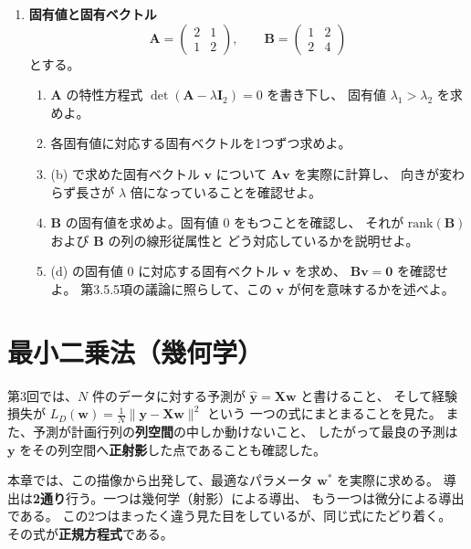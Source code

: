 \begin{enumerate}
  \item \textbf{固有値と固有ベクトル}\quad
    \begin{equation*}
      \bm{A} = \begin{pmatrix} 2 & 1 \\ 1 & 2 \end{pmatrix},
      \qquad
      \bm{B} = \begin{pmatrix} 1 & 2 \\ 2 & 4 \end{pmatrix}
    \end{equation*}
    とする。
    \begin{enumerate}
      \item $\bm{A}$ の特性方程式 $\det(\bm{A} - \lambda\bm{I}_2) = 0$ を書き下し、
        固有値 $\lambda_1 > \lambda_2$ を求めよ。
      \item 各固有値に対応する固有ベクトルを1つずつ求めよ。
      \item (b) で求めた固有ベクトル $\bm{v}$ について $\bm{A}\bm{v}$ を実際に計算し、
        向きが変わらず長さが $\lambda$ 倍になっていることを確認せよ。
      \item $\bm{B}$ の固有値を求めよ。固有値 $0$ をもつことを確認し、
        それが $\mathrm{rank}(\bm{B})$ および $\bm{B}$ の列の線形従属性と
        どう対応しているかを説明せよ。
      \item (d) の固有値 $0$ に対応する固有ベクトル $\bm{v}$ を求め、
        $\bm{B}\bm{v} = \bm{0}$ を確認せよ。
        第3.5.5項の議論に照らして、この $\bm{v}$ が何を意味するかを述べよ。
    \end{enumerate}
\end{enumerate}



\section{最小二乗法（幾何学）}

第3回では、$N$ 件のデータに対する予測が $\hat{\bm{y}} = \bm{X}\bm{w}$ と書けること、
そして経験損失が $L_D(\bm{w}) = \frac{1}{N}\|\bm{y} - \bm{X}\bm{w}\|^2$ という
一つの式にまとまることを見た。
また、予測が計画行列の\textbf{列空間}の中しか動けないこと、
したがって最良の予測は $\bm{y}$ をその列空間へ\textbf{正射影}した点であることも確認した。

本章では、この描像から出発して、最適なパラメータ $\bm{w}^*$ を実際に求める。
導出は\textbf{2通り}行う。一つは幾何学（射影）による導出、
もう一つは微分による導出である。
この2つはまったく違う見た目をしているが、同じ式にたどり着く。
その式が\textbf{正規方程式}である。

